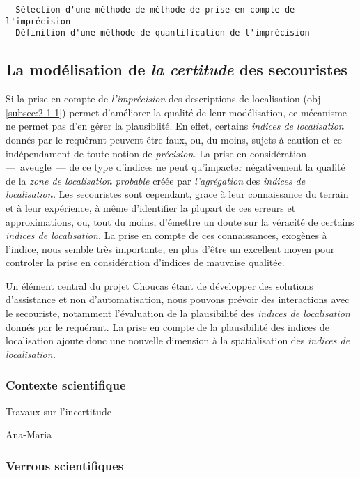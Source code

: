 \begin{verbatim}
- Sélection d'une méthode de méthode de prise en compte de
l'imprécision
- Définition d'une méthode de quantification de l'imprécision
\end{verbatim}

\subsection{La modélisation de \emph{la certitude} des secouristes}
\label{subsec:2-1-3}

Si la prise en compte de \emph{l'imprécision} des descriptions de
localisation (obj. \ref{subsec:2-1-1}) permet d'améliorer la qualité
de leur modélisation, ce mécanisme ne permet pas d'en gérer la
plausiblité. En effet, certains \emph{indices de localisation} donnés
par le requérant peuvent être faux, ou, du moins, sujets à caution et
ce indépendament de toute notion de \emph{précision.} La prise en
considération ---~aveugle~--- de ce type d'indices ne peut qu'impacter
négativement la qualité de la \emph{zone de localisation probable}
créée par \emph{l'agrégation} des \emph{indices de localisation.} Les
secouristes sont cependant, grace à leur connaissance du terrain et à
leur expérience, à même d'identifier la plupart de ces erreurs et
approximations, ou, tout du moins, d’émettre un doute sur la véracité
de certains \emph{indices de localisation.} La prise en compte de ces
connaissances, exogènes à l'indice, nous semble très importante, en
plus d'être un excellent moyen pour controler la prise en
considération d'indices de mauvaise qualitée.

Un élément central du projet Choucas étant de développer des solutions
d'assistance et non d'automatisation, nous pouvons prévoir des
interactions avec le secouriste, notamment l'évaluation de la
plausibilité des \emph{indices de localisation} donnés par le
requérant. La prise en compte de la plausibilité des indices de
localisation ajoute donc une nouvelle dimension à la spatialisation
des \emph{indices de localisation.}

\subsubsection{Contexte scientifique}

Travaux sur l'incertitude

Ana-Maria

\subsubsection{Verrous scientifiques}

